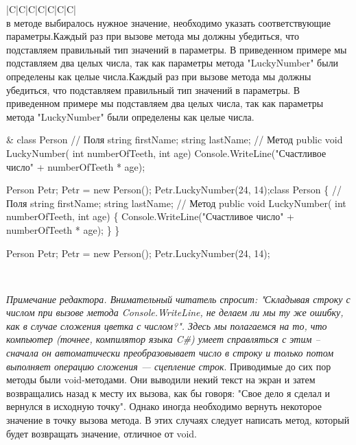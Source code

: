 \documentclass[12pt, a4paper]{article}
\begin{document}
\begin{table}[!ht] \setlength\extrarowheight{2pt} \begin{tabularx}{\textwidth}{|C|C|C|C|C|C|C|} \hline{}\\  в методе выбиралось нужное значение, необходимо указать соответствующие параметры.Каждый раз при вызове метода мы должны убедиться, что подставляем правильный тип значений в параметры. В приведенном примере мы подставляем два целых числа, так как параметры метода "LuckyNumber" были определены как целые числа.Каждый раз при вызове метода мы должны убедиться, что подставляем правильный тип значений в параметры. В приведенном примере мы подставляем два целых числа, так как параметры метода "LuckyNumber" были определены как целые числа.

&
class Person
{
  // Поля
  string firstName;
  string lastName;
  // Метод
  public void LuckyNumber(
  int numberOfTeeth, int age)
  {
    Console.WriteLine("Счастливое число" + numberOfTeeth * age);
  }
}

Person Petr;
Petr = new Person();
Petr.LuckyNumber(24, 14);class Person
\{
  // Поля
  string firstName;
  string lastName;
  // Метод
  public void LuckyNumber(
  int numberOfTeeth, int age)
  \{
    Console.WriteLine("Счастливое число" + numberOfTeeth * age);
  \}
\}

Person Petr;
Petr = new Person();
Petr.LuckyNumber(24, 14);

\\ \hline\end{tabularx}         \end{table}



\textit{Примечание редактора. Внимательный читатель спросит: "Складывая строку с числом при вызове метода Console.WriteLine, не делаем ли мы ту же ошибку, как в случае сложения цветка с числом?". Здесь мы полагаемся на то, что компьютер (точнее, компилятор языка C\#) умеет справляться с этим – сначала он автоматически преобразовывает число в строку и только потом выполняет операцию сложения — сцепление строк}.
Приводимые до сих пор методы были void-методами. Они выводили некий текст на экран и затем возвращались назад к месту их вызова, как бы говоря: "Свое дело я сделал и вернулся в исходную точку". Однако иногда необходимо вернуть некоторое значение в точку вызова метода. В этих случаях следует написать метод, который будет возвращать значение, отличное от void.\\
\end{document}
